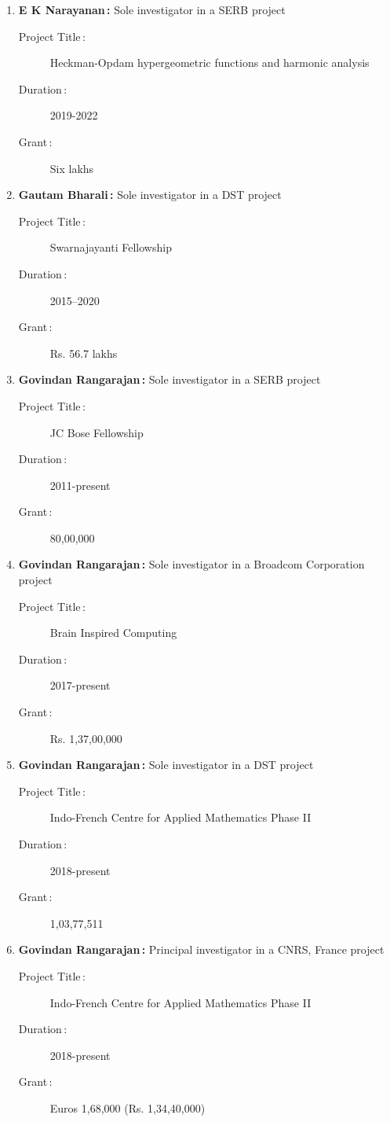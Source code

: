 \begin{enumerate}
\item {\bf E K Narayanan\,:} Sole investigator in a SERB project
\begin{description}
  \item[Project Title\,:] Heckman-Opdam hypergeometric functions and harmonic analysis
  \item[Duration\,:] 2019-2022
  \item[Grant\,:] Six lakhs
\end{description}


\item {\bf Gautam Bharali\,:} Sole investigator in a DST project
\begin{description}
  \item[Project Title\,:] Swarnajayanti Fellowship
  \item[Duration\,:] 2015--2020
  \item[Grant\,:] Rs. 56.7 lakhs
\end{description}


\item {\bf Govindan Rangarajan\,:} Sole investigator in a SERB project
\begin{description}
  \item[Project Title\,:] JC Bose Fellowship
  \item[Duration\,:] 2011-present
  \item[Grant\,:] 80,00,000
\end{description}


\item {\bf Govindan Rangarajan\,:} Sole investigator in a Broadcom Corporation project
\begin{description}
  \item[Project Title\,:] Brain Inspired Computing
  \item[Duration\,:] 2017-present
  \item[Grant\,:] Rs. 1,37,00,000
\end{description}


\item {\bf Govindan Rangarajan\,:} Sole investigator in a DST project
\begin{description}
  \item[Project Title\,:] Indo-French Centre for Applied Mathematics Phase II
  \item[Duration\,:] 2018-present
  \item[Grant\,:] 1,03,77,511
\end{description}


\item {\bf Govindan Rangarajan\,:} Principal investigator in a CNRS, France project
\begin{description}
  \item[Project Title\,:] Indo-French Centre for Applied Mathematics Phase II
  \item[Duration\,:] 2018-present
  \item[Grant\,:] Euros 1,68,000 (Rs. 1,34,40,000)
\end{description}



\end{enumerate}

